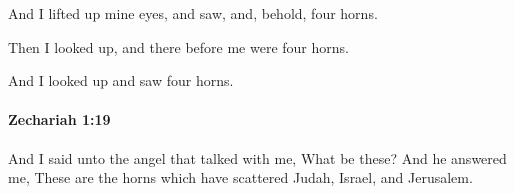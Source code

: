 			\begin{versebox}
					\item[BHS] 
					\item[LXX] 
					\item[ASV] And I lifted up mine eyes, and saw, and, behold, four horns.
					\item[NIV] Then I looked up, and there before me were four horns.
					\item[NRSV] And I looked up and saw four horns.
			\end{versebox}

		\paragraph{Zechariah 1:19} %
			\label{ZECHARIAH-1-19}

			And I said unto the angel that talked with me, What be these? And he answered me, These are the horns which have scattered Judah, Israel, and Jerusalem.


